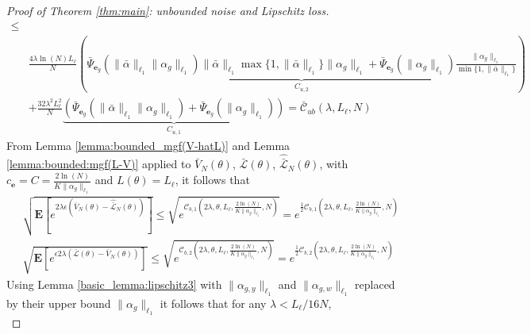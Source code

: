 \documentclass{article}
\def\rve{{\mathbf{e}}}
\newcommand{\e}{\mathbf{e}}
\newcommand{\bE}{\mathbf{E}}
\begin{document}
\begin{proof}[Proof of Theorem \ref{thm:main}: unbounded noise and Lipschitz loss]
\begin{equation}
\begin{aligned}
    \le  \\
     & \frac{4\lambda \ln(N) L_{\ell}}{N} \left( 
      \underbrace{\bar{\Psi}_{\e_g}(\|\bar{\alpha}\|_{\ell_1}\|\alpha_g\|_{\ell_1})\|\bar{\alpha}\|_{\ell_1}\max\{1,\|\bar{\alpha}\|_{\ell_1}\}\|\alpha_g\|_{\ell_1} + \bar{\Psi}_{\e_g}(\|\alpha_g\|_{\ell_1})\frac{\|\alpha_g\|_{\ell_1}}{\min\{1,\|\bar{\alpha}\|_{\ell_1}\}}}_{C_{u,2}}\right)  \\
    & +\frac{32\lambda^2L_{\ell}^2}{N}\underbrace{\left(\bar{\Psi}_{\e_g}(\|\bar{\alpha}\|_{\ell_1}\|\alpha_g\|_{\ell_1})+ \bar{\Psi}_{\e_g}(\|\alpha_g\|_{\ell_1}) \right)}_{C_{u,1}}=\bar{\mathcal{C}}_{ub}(\lambda, L_{\ell},N)
 \end{aligned}
\end{equation}
  From Lemma \ref{lemma:bounded_mgf(V-hatL)} and Lemma \ref{lemma:bounded:mgf(L-V)} applied to 
  $\bar{V}_N(\theta)$, $\bar{\mathcal{L}}(\theta)$, $\hat{\bar{\mathcal{L}}}_N(\theta)$, with  $c_{\rve}=C=\frac{2\ln(N)}{K\|\alpha_g\|_{\ell_1}}$
  and $L(\theta)=L_{\ell}$,
  it follows that 
  \begin{align*}
    & \sqrt{\bE[e^{2\lambda \epsilon (\bar{V}_N(\theta)-\hat{\bar{\mathcal{L}}}_N(\theta))}]}
    \le \sqrt{e^{\mathcal{C}_{b,1}(2\lambda,\theta,L_{\ell},\frac{2\ln(N)}{K\|\alpha_g\|_{\ell_1}},N)}}=e^{\frac{1}{2}\mathcal{C}_{b,1}(2\lambda,\theta,L_{\ell},\frac{2\ln(N)}{K\|\alpha_g\|_{\ell_1}},N)}
    \\
    & \sqrt{\bE[e^{\epsilon 2\lambda(\bar{\mathcal{L}}(\theta)-\bar{V}_N(\theta))}]} \leq 
    \sqrt{e^{\mathcal{C}_{b,2}(2\lambda,\theta,L_{\ell},\frac{2\ln(N)}{K\|\alpha_g\|_{\ell_1}},N)}}=e^{\frac{1}{2}\mathcal{C}_{b,2}(2\lambda,\theta,L_{\ell},\frac{2\ln(N)}{K\|\alpha_g\|_{\ell_1}},N)}
  \end{align*} 
 Using Lemma \ref{basic_lemma:lipschitz3} with $\|\alpha_{g,y}\|_{\ell_1}$ and $\|\alpha_{g,w}\|_{\ell_1}$ replaced by their upper bound $\|\alpha_{g}\|_{\ell_1}$ it follows that 
 for any $\lambda  < L_{\ell}/16N$, 
 \begin{equation}
  \label{thm:main:pf:unbounded:eq1}

\end{equation}
\end{proof}
\end{document}
